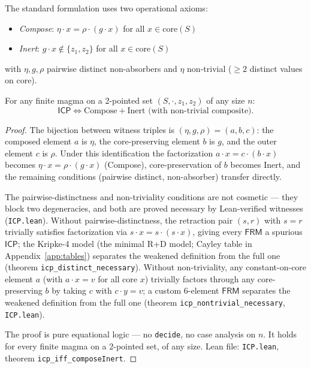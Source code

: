 \documentclass[a4paper,UKenglish,cleveref,autoref,thm-restate]{lipics-v2021}
\newcommand{\dotop}{\cdot}
\newcommand{\FRM}{\textsf{FRM}}
\newcommand{\ICP}{\textsf{ICP}}
\newcommand{\core}{\mathrm{core}}
\begin{document}
The standard formulation uses two operational axioms:
\begin{itemize}
  \item \emph{Compose}: $\eta \dotop x = \rho \dotop (g \dotop x)$ for all $x \in \core(S)$
  \item \emph{Inert}: $g \dotop x \notin \{z_1, z_2\}$ for all $x \in \core(S)$
\end{itemize}
with $\eta, g, \rho$ pairwise distinct non-absorbers and $\eta$ non-trivial ($\geq 2$ distinct values on core).

\begin{theorem}[$\ICP$ Equivalence]
\label{thm:icp-equiv}
For any finite magma on a 2-pointed set $(S, \dotop, z_1, z_2)$ of any size $n$:
\[
\ICP \iff \text{Compose} + \text{Inert} \text{ (with non-trivial composite)}.
\]
\end{theorem}

\begin{proof}
The bijection between witness triples is $(\eta, g, \rho) = (a, b, c)$: the composed element $a$ is $\eta$, the core-preserving element $b$ is $g$, and the outer element $c$ is $\rho$. Under this identification the factorization $a \dotop x = c \dotop (b \dotop x)$ becomes $\eta \dotop x = \rho \dotop (g \dotop x)$ (Compose), core-preservation of $b$ becomes Inert, and the remaining conditions (pairwise distinct, non-absorber) transfer directly.

The pairwise-distinctness and non-triviality conditions are not cosmetic --- they block two degeneracies, and both are proved necessary by Lean-verified witnesses (\texttt{ICP.lean}). Without pairwise-distinctness, the retraction pair $(s, r)$ with $s = r$ trivially satisfies factorization via $s \dotop x = s \dotop (s \dotop x)$, giving every $\FRM$ a spurious $\ICP$; the Kripke-4 model (the minimal R{+}D model; Cayley table in Appendix~\ref{app:tables}) separates the weakened definition from the full one (theorem \texttt{icp\_distinct\_necessary}). Without non-triviality, any constant-on-core element $a$ (with $a \dotop x = v$ for all core $x$) trivially factors through any core-preserving $b$ by taking $c$ with $c \dotop y = v$; a custom 6-element $\FRM$ separates the weakened definition from the full one (theorem \texttt{icp\_nontrivial\_necessary}, \texttt{ICP.lean}).

The proof is pure equational logic --- no \texttt{decide}, no case analysis on $n$. It holds for every finite magma on a 2-pointed set, of any size. Lean file: \texttt{ICP.lean}, theorem \texttt{icp\_iff\_composeInert}.
\end{proof}
\end{document}
